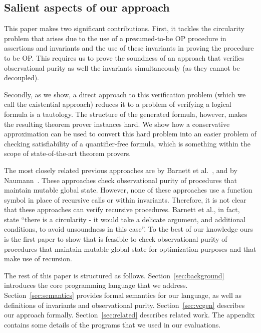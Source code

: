 \subsection{Salient aspects of our approach}

This paper makes two significant contributions. First, it tackles the circularity
problem that arises due to the use of a presumed-to-be OP procedure
in assertions and invariants and the use of these invariants in proving the
procedure to be OP. This requires us to prove the soundness of an approach
that verifies observational purity as well the invariants simultaneously (as they
cannot be decoupled).

Secondly, as we show, a direct approach to this verification problem (which we
call the existential approach) reduces it to a problem of verifying a logical formula
is a tautology. The structure of the generated formula, however, makes the resulting
theorem prover instances hard. We show how a conservative approximation can be
used to convert this hard problem into an easier problem of checking satisfiability
of a quantifier-free formula, which is something within the scope of state-of-the-art theorem
provers.


The most closely related previous approaches are by Barnett et
al.~\cite{barnett200499,barnett2006allowing}, and by
Naumann~\cite{naumann2007observational}.  These approaches check observational
purity of procedures that maintain mutable global state. However, none of
these approaches use a function symbol in place of recursive calls or
within invariants. Therefore, it is not clear that these approaches can
verify recursive procedures. 
Barnett et al., in fact, state ``there is a circularity - it would take a delicate argument, and additional conditions,
to avoid unsoundness in this case''.
To the best of our knowledge ours is the first paper to show that is
feasible to check observational purity of procedures that maintain mutable
global state for optimization purposes and that make use of recursion.



The rest of this paper is structured as
follows. Section~\ref{sec:background} introduces the core programming
language that we address. Section~\ref{sec:semantics} provides formal
semantics for our language, as well as definitions of invariants and
observational purity. Section~\ref{sec:vcgen} describes our approach
formally.
Section~\ref{sec:related} describes related work. The appendix contains some details of the programs
that we used in our evaluations. 

